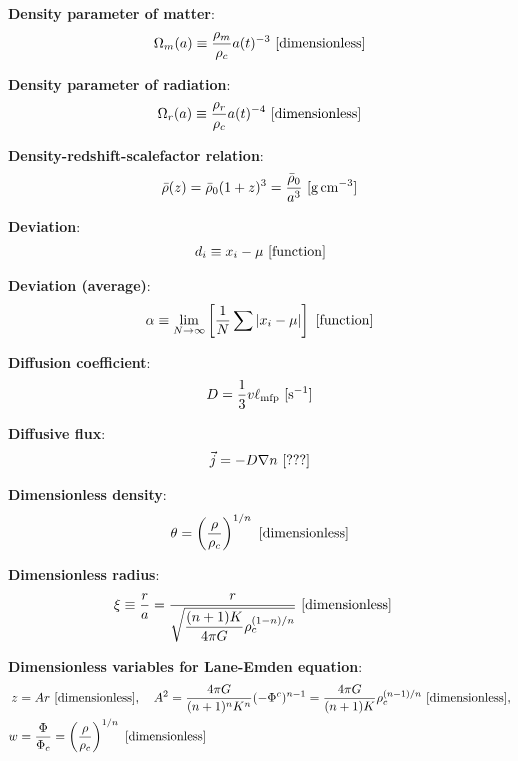 \documentclass[a4paper,10pt]{article}
\begin{document}
{\noindent}\textbf{Density parameter of matter}:
\begin{align*}
    \Omega_m(a) \equiv \dfrac{\rho_m}{\rho_c}a(t)^{-3} ~ [{\rm dimensionless}]
\end{align*}

{\noindent}\textbf{Density parameter of radiation}:
\begin{align*}
    \Omega_r(a) \equiv \dfrac{\rho_r}{\rho_c}a(t)^{-4} ~ [{\rm dimensionless}]
\end{align*}

{\noindent}\textbf{Density-redshift-scalefactor relation}:
\begin{align*}
    \bar{\rho}(z) = \bar{\rho}_0(1+z)^3 = \frac{\bar{\rho}_0}{a^3} ~ [{\rm g\,cm^{-3}}]
\end{align*}

{\noindent}\textbf{Deviation}:
\begin{align*}
    d_i \equiv x_i - \mu ~ [{\rm function}]
\end{align*}

{\noindent}\textbf{Deviation (average)}:
\begin{align*}
    \alpha \equiv \lim_{N\rightarrow\infty}\left[ \frac{1}{N} \sum \left\lvert x_i-\mu\right\rvert \right] ~ [{\rm function}]
\end{align*}

{\noindent}\textbf{Diffusion coefficient}:
\begin{align*}
    D = \frac{1}{3}v\ell_{\rm mfp} ~ [{\rm s^{-1}}]
\end{align*}

{\noindent}\textbf{Diffusive flux}:
\begin{align*}
    \vec{j} = -D\nabla n ~ [{\rm ???}]
\end{align*}

{\noindent}\textbf{Dimensionless density}:
\begin{align*}
    \theta = \left(\frac{\rho}{\rho_c}\right)^{1/n} ~ [{\rm dimensionless}]
\end{align*}

{\noindent}\textbf{Dimensionless radius}:
\begin{align*}
    \xi &\equiv \frac{r}{a} = \frac{r}{\sqrt{\dfrac{(n+1)K}{4\pi G}\rho_c^{(1-n)/n}}} ~ [{\rm dimensionless}]
\end{align*}

{\noindent}\textbf{Dimensionless variables for Lane-Emden equation}:
\begin{align*}
    z &= Ar ~ [{\rm dimensionless}], ~~~ A^2 = \frac{4\pi G}{(n+1)^nK^n}(-\Phi^c)^{n-1} = \frac{4\pi G}{(n+1)K}\rho_c^{(n-1)/n} ~ [{\rm dimensionless}],\\
    w &= \frac{\Phi}{\Phi_c} = \left(\frac{\rho}{\rho_c}\right)^{1/n} ~ [{\rm dimensionless}]
\end{align*}
\end{document}
